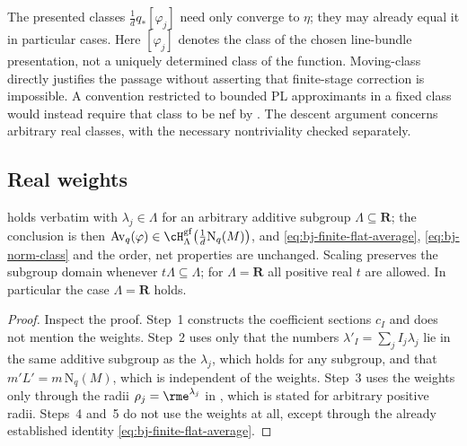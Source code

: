 \begin{remark}
\label{rem:ch41-varying-classes-needed}
The presented classes $\frac1dq_*[\varphi_j]$ need only converge
to $\eta$; they may already equal it in particular cases.
Here $[\varphi_j]$ denotes the class of the chosen line-bundle
presentation, not a uniquely determined class of the function.
Moving-class  directly justifies the passage without
asserting that finite-stage correction is impossible.
A convention restricted to bounded PL approximants in a fixed class
would instead require that class to be nef by
.  The descent argument concerns arbitrary
real classes, with the necessary nontriviality checked separately.
\end{remark}

\subsection{Real weights}
\label{sec:ch41-real-weights}

\begin{corollary}
\label{cor:ch41-real-weights}
 holds verbatim with
$\lambda_j\in\Lambda$ for an arbitrary additive subgroup
$\Lambda\subseteq\mathbf R$; the conclusion is then
$\operatorname{Av}_q(\varphi)\in\cH^{\mathrm{gf}}_\Lambda
\bigl(\tfrac1d\mathrm N_q(M)\bigr)$, and
\eqref{eq:bj-finite-flat-average}, \eqref{eq:bj-norm-class} and the order,
net properties are unchanged.  Scaling preserves the subgroup
domain whenever $t\Lambda\subseteq\Lambda$; for $\Lambda=\mathbf R$
all positive real $t$ are allowed.  In particular the case
$\Lambda=\mathbf R$ holds.
\end{corollary}

\begin{proof}
Inspect the proof.  Step~1 constructs the coefficient sections $c_I$ and
does not mention the weights.  Step~2 uses only that the numbers
$\lambda'_I=\sum_jI_j\lambda_j$ lie in the same additive subgroup as the
$\lambda_j$, which holds for any subgroup, and that
$m'L'=m\,\mathrm N_q(M)$, which is independent of the weights.  Step~3
uses the weights only through the radii $\rho_j=\rme^{\lambda_j}$ in
, which is stated for arbitrary positive
radii.  Steps~4 and~5 do not use the weights at all, except through the
already established identity \eqref{eq:bj-finite-flat-average}.
\end{proof}

